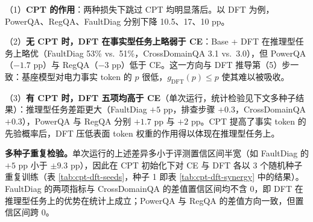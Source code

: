 \documentclass[fontset=fandol,type=master,campus=shenzhen,etitleauto=true]{hithesisbook}
\begin{document}
\begin{table}[htbp]
\centering
\caption{初始化基座（Base vs.\ CPT）与微调目标（Standard CE vs.\ DFT）的 $2 \times 2$ 对比结果}
\label{tab:cpt-dft-synergy}
\small
\setlength{\tabcolsep}{4pt}
\renewcommand{\arraystretch}{1.15}
\end{table}

（1）\textbf{CPT 的作用}：两种损失下跳过 CPT 均明显落后。以 DFT 为例，PowerQA、RegQA、FaultDiag 分别下降 10.5、17、10 pp。

（2）\textbf{无 CPT 时，DFT 在事实型任务上略弱于 CE}：Base + DFT 在推理型任务上略优（FaultDiag 53\% vs.\ 51\%，CrossDomainQA 3.1 vs.\ 3.0），但 PowerQA（$-1.7$ pp）与 RegQA（$-3$ pp）低于 CE。这一方向与 DFT 推导第（5）步一致：基座模型对电力事实 token 的 $p$ 很低，$g_{\text{DFT}}(p) \le p$ 使其难以被吸收。

（3）\textbf{有 CPT 时，DFT 五项均高于 CE}（单次运行，统计检验见下文多种子结果）：推理型任务差距更大（FaultDiag $+5$ pp，排查步骤 $+0.3$，CrossDomainQA $+0.3$），PowerQA 与 RegQA 分别 $+1.7$ pp 与 $+2$ pp。CPT 提高了事实 token 的先验概率后，DFT 压低表面 token 权重的作用得以体现在推理型任务上。

\textbf{多种子重复检验。}单次运行的上述差异多小于评测置信区间半宽（如 FaultDiag 的 $+5$ pp 小于 $\pm 9.3$ pp），因此在 CPT 初始化下对 CE 与 DFT 各以 3 个随机种子重复训练（表 \ref{tab:cpt-dft-seeds}，种子 1 即表 \ref{tab:cpt-dft-synergy} 中的结果）。FaultDiag 的两项指标与 CrossDomainQA 的差值置信区间均不含 0，即 DFT 在推理型任务上的优势在统计上成立；PowerQA 与 RegQA 的差值方向一致，但置信区间跨 0。
\end{document}
